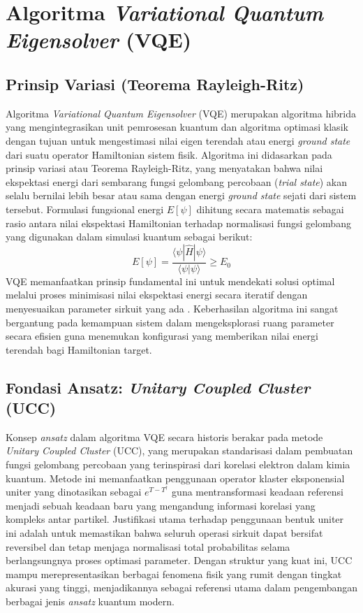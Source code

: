 \section{Algoritma \textit{Variational Quantum Eigensolver} (VQE)}

\subsection{Prinsip Variasi (Teorema Rayleigh-Ritz)}
Algoritma \textit{Variational Quantum Eigensolver} (VQE) merupakan algoritma hibrida yang mengintegrasikan unit pemrosesan kuantum dan algoritma optimasi klasik dengan tujuan untuk mengestimasi nilai eigen terendah atau energi \textit{ground state} dari suatu operator Hamiltonian sistem fisik. Algoritma ini didasarkan pada prinsip variasi atau Teorema Rayleigh-Ritz, yang menyatakan bahwa nilai ekspektasi energi dari sembarang fungsi gelombang percobaan (\textit{trial state}) akan selalu bernilai lebih besar atau sama dengan energi \textit{ground state} sejati dari sistem tersebut. Formulasi fungsional energi $E[\psi]$ dihitung secara matematis sebagai rasio antara nilai ekspektasi Hamiltonian terhadap normalisasi fungsi gelombang yang digunakan dalam simulasi kuantum sebagai berikut:
\begin{equation}
E[\psi] = \frac{\langle\psi|\hat{H}|\psi\rangle}{\langle\psi|\psi\rangle} \ge E_0
\end{equation}
VQE memanfaatkan prinsip fundamental ini untuk mendekati solusi optimal melalui proses minimisasi nilai ekspektasi energi secara iteratif dengan menyesuaikan parameter sirkuit yang ada \cite{peruzzo_2014}. Keberhasilan algoritma ini sangat bergantung pada kemampuan sistem dalam mengeksplorasi ruang parameter secara efisien guna menemukan konfigurasi yang memberikan nilai energi terendah bagi Hamiltonian target.

\subsection{Fondasi Ansatz: \textit{Unitary Coupled Cluster} (UCC)}
Konsep \textit{ansatz} dalam algoritma VQE secara historis berakar pada metode \textit{Unitary Coupled Cluster} (UCC), yang merupakan standarisasi dalam pembuatan fungsi gelombang percobaan yang terinspirasi dari korelasi elektron dalam kimia kuantum. Metode ini memanfaatkan penggunaan operator klaster eksponensial uniter yang dinotasikan sebagai $e^{T-T^\dagger}$ guna mentransformasi keadaan referensi menjadi sebuah keadaan baru yang mengandung informasi korelasi yang kompleks antar partikel. Justifikasi utama terhadap penggunaan bentuk uniter ini adalah untuk memastikan bahwa seluruh operasi sirkuit dapat bersifat reversibel dan tetap menjaga normalisasi total probabilitas selama berlangsungnya proses optimasi parameter. Dengan struktur yang kuat ini, UCC mampu merepresentasikan berbagai fenomena fisik yang rumit dengan tingkat akurasi yang tinggi, menjadikannya sebagai referensi utama dalam pengembangan berbagai jenis \textit{ansatz} kuantum modern.

